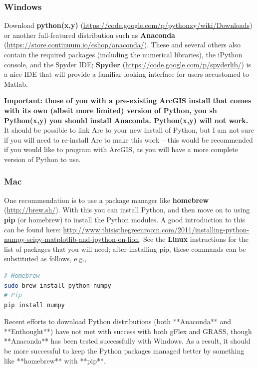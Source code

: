 \documentclass[a4paper,10pt]{scrartcl}
\begin{document}
\subsubsection{Windows}

Download \textbf{python(x,y)} (\url{https://code.google.com/p/pythonxy/wiki/Downloads}) or another full-featured distribution such as \textbf{Anaconda} (\url{https://store.continuum.io/cshop/anaconda/}). These and several others also contain the required packages (including the numerical libraries), the iPython console, and the Spyder IDE; \textbf{Spyder} (\url{https://code.google.com/p/spyderlib/}) is a nice IDE that will provide a familiar-looking interface for users accustomed to Matlab. 

\begin{framed}
\textbf{Important: those of you with a pre-existing ArcGIS install that comes with its own (albeit more limited) version of Python, you sh Python(x,y) you should install Anaconda. Python(x,y) will not work.} It should be possible to link Arc to your new install of Python, but I am not sure if you will need to re-install Arc to make this work -- this would be recommended if you would like to program with ArcGIS, as you will have a more complete version of Python to use.
\end{framed}

\subsubsection{Mac}

One recommendation is to use a package manager like \textbf{homebrew} (\url{http://brew.sh/}). With this you can install Python, and then move on to using \textbf{pip} (or homebrew) to install the Python modules. A good introduction to this can be found here: \url{http://www.thisisthegreenroom.com/2011/installing-python-numpy-scipy-matplotlib-and-ipython-on-lion}. See the \textbf{Linux} instructions for the list of packages that you will need; after installing pip, these commands can be substituted as follows, e.g.,

\begin{lstlisting}[language=sh]
# Homebrew
sudo brew install python-numpy
# Pip
pip install numpy
\end{lstlisting}

Recent efforts to download Python distributions (both **Anaconda** and **Enthought**) have not met with success with both gFlex and GRASS, though **Anaconda** has been tested successfully with Windows. As a result, it should be more successful to keep the Python packages managed better by something like **homebrew** with **pip**.
\end{document}
